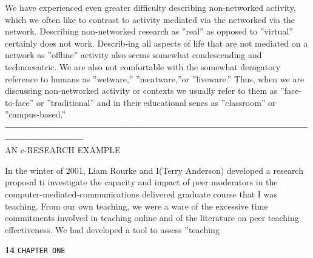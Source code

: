 \documentclass{book}
\begin{document}
 \hspace*{0.4cm} We have experienced even greater difficulty describing non-networked activity, which we often like to contrast to activity mediated via the networked via the network. Describing non-networked research as ''real'' as opposed to ''virtual'' certainly does not work. Describ-ing all aspects of life that are not mediated on a network as ''offline'' activity also seems somewhat condescending and technocentric. We are also not comfortable with the somewhat derogatory reference to humans as ''wetware,'' ''meatware,''or ''liveware.'' Thus, when we are discussing non-networked activity or contexts we usually refer to them as ''face-to-face'' or ''traditional'' and in their educational senes as ''classroom'' or ''campus-based.''\\

\vspace*{0.6cm}
\textbf{---------------------------------------------------------------------------------------------------------------------}\\
\large{
AN e-RESEARCH EXAMPLE
}

\vspace*{0.3cm}
 In the winter of 2001, Liam Rourke and I(Terry Anderson) developed a research proposal ti investigate the capacity and impact of peer moderators in the computer-mediated-communications delivered graduate course that I was teaching. From our own teaching, we were a ware of the excessive time commitments involved in teaching online and of the literature on peer teaching effectiveness. We had developed a tool to assess ''teaching \\
 
 \newpage
 \begin{flushleft}
\textbf{14}\hspace*{1cm} \texttt{CHAPTER ONE}
\end{flushleft}
\end{document}

